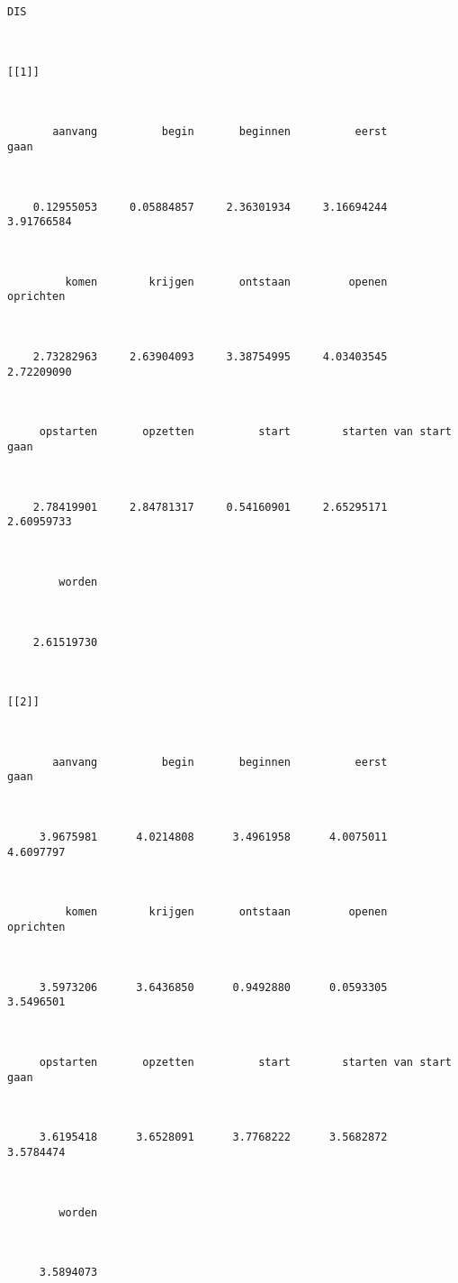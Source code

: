 \begin{lstlisting}
DIS



[[1]]



       aanvang          begin       beginnen          eerst           gaan 



    0.12955053     0.05884857     2.36301934     3.16694244     3.91766584 



         komen        krijgen       ontstaan         openen      oprichten 



    2.73282963     2.63904093     3.38754995     4.03403545     2.72209090 



     opstarten       opzetten          start        starten van start gaan 



    2.78419901     2.84781317     0.54160901     2.65295171     2.60959733 



        worden 



    2.61519730 



[[2]]



       aanvang          begin       beginnen          eerst           gaan 



     3.9675981      4.0214808      3.4961958      4.0075011      4.6097797 



         komen        krijgen       ontstaan         openen      oprichten 



     3.5973206      3.6436850      0.9492880      0.0593305      3.5496501 



     opstarten       opzetten          start        starten van start gaan 



     3.6195418      3.6528091      3.7768222      3.5682872      3.5784474 



        worden 



     3.5894073 




\end{lstlisting}
